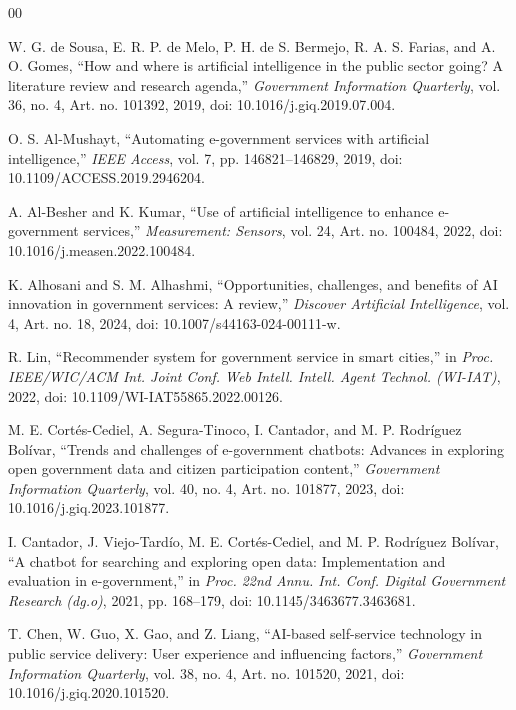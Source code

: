 \documentclass[conference]{IEEEtran}
\begin{document}
\begin{thebibliography}{00}

W. G. de Sousa, E. R. P. de Melo, P. H. de S. Bermejo, R. A. S. Farias, and A. O. Gomes, ``How and where is artificial intelligence in the public sector going? A literature review and research agenda,'' \textit{Government Information Quarterly}, vol. 36, no. 4, Art. no. 101392, 2019, doi: 10.1016/j.giq.2019.07.004.

O. S. Al-Mushayt, ``Automating e-government services with artificial intelligence,'' \textit{IEEE Access}, vol. 7, pp. 146821--146829, 2019, doi: 10.1109/ACCESS.2019.2946204.

A. Al-Besher and K. Kumar, ``Use of artificial intelligence to enhance e-government services,'' \textit{Measurement: Sensors}, vol. 24, Art. no. 100484, 2022, doi: 10.1016/j.measen.2022.100484.

K. Alhosani and S. M. Alhashmi, ``Opportunities, challenges, and benefits of AI innovation in government services: A review,'' \textit{Discover Artificial Intelligence}, vol. 4, Art. no. 18, 2024, doi: 10.1007/s44163-024-00111-w.

R. Lin, ``Recommender system for government service in smart cities,'' in \textit{Proc. IEEE/WIC/ACM Int. Joint Conf. Web Intell. Intell. Agent Technol. (WI-IAT)}, 2022, doi: 10.1109/WI-IAT55865.2022.00126.

M. E. Cortés-Cediel, A. Segura-Tinoco, I. Cantador, and M. P. Rodríguez Bolívar, ``Trends and challenges of e-government chatbots: Advances in exploring open government data and citizen participation content,'' \textit{Government Information Quarterly}, vol. 40, no. 4, Art. no. 101877, 2023, doi: 10.1016/j.giq.2023.101877.

I. Cantador, J. Viejo-Tardío, M. E. Cortés-Cediel, and M. P. Rodríguez Bolívar, ``A chatbot for searching and exploring open data: Implementation and evaluation in e-government,'' in \textit{Proc. 22nd Annu. Int. Conf. Digital Government Research (dg.o)}, 2021, pp. 168--179, doi: 10.1145/3463677.3463681.

T. Chen, W. Guo, X. Gao, and Z. Liang, ``AI-based self-service technology in public service delivery: User experience and influencing factors,'' \textit{Government Information Quarterly}, vol. 38, no. 4, Art. no. 101520, 2021, doi: 10.1016/j.giq.2020.101520.


\end{thebibliography}
\end{document}
